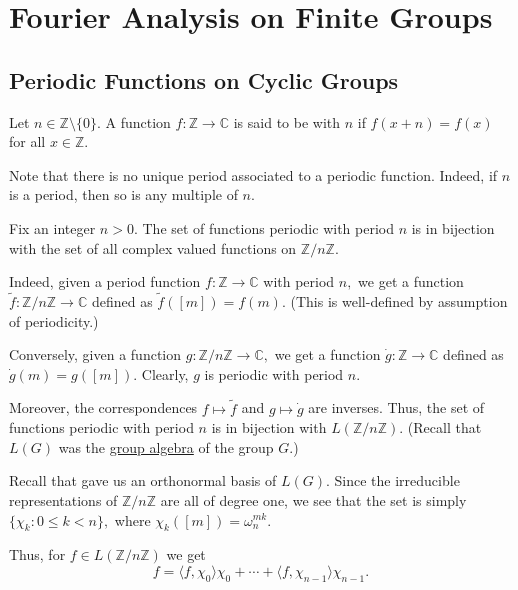 \section{Fourier Analysis on Finite Groups} \label{sec:07}
\subsection{Periodic Functions on Cyclic Groups}

\begin{defn}
    Let $n \in \mathbb{Z} \setminus \{0\}.$ A function $f : \mathbb{Z} \to \mathbb{C}$ is said to be  with  $n$ if $f(x + n) = f(x)$ for all $x \in \mathbb{Z}.$
\end{defn}

Note that there is no unique period associated to a periodic function. Indeed, if $n$ is a period, then so is any multiple of $n.$

\begin{rem}
    Fix an integer $n > 0.$ The set of functions periodic with period $n$ is in bijection with the set of all complex valued functions on $\mathbb{Z}/n\mathbb{Z}.$
    
    Indeed, given a period function $f : \mathbb{Z} \to \mathbb{C}$ with period $n,$ we get a function $\tilde{f} : \mathbb{Z}/n\mathbb{Z} \to \mathbb{C}$ defined as $\tilde{f}([m]) = f(m).$ (This is well-defined by assumption of periodicity.)
    
    Conversely, given a function $g : \mathbb{Z}/n\mathbb{Z} \to \mathbb{C},$ we get a function $\dot{g} : \mathbb{Z} \to \mathbb{C}$ defined as $\dot{g}(m) = g([m]).$ Clearly, $g$ is periodic with period $n.$
    
    Moreover, the correspondences $f \mapsto \tilde{f}$ and $g \mapsto \dot{g}$ are inverses. Thus, the set of functions periodic with period $n$ is in bijection with $L(\mathbb{Z}/n\mathbb{Z}).$ (Recall that $L(G)$ was the \hyperref[defn:groupalg]{group algebra} of the group $G.$)
\end{rem}

\begin{rem}
    Recall that  gave us an orthonormal basis of $L(G).$ Since the irreducible representations of $\mathbb{Z}/n\mathbb{Z}$ are all of degree one, we see that the set is simply $\{\chi_k : 0 \le k < n\},$ where $\chi_k([m]) = \omega_n^{mk}.$
    
    Thus, for $f \in L(\mathbb{Z}/n\mathbb{Z})$ we get 
    \begin{equation*}
        f = \langle f, \chi_0\rangle \chi_0 + \cdots + \langle f, \chi_{n - 1}\rangle \chi_{n - 1}.
    \end{equation*}
\end{rem}

